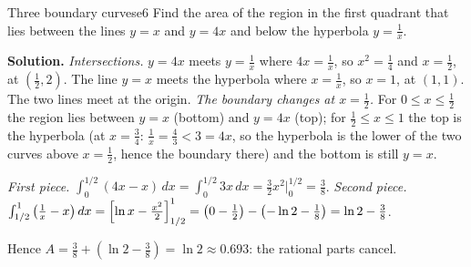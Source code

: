 \documentclass[11pt]{article}
\begin{document}
\begin{exmp}{Three boundary curves}{e6}
Find the area of the region in the first quadrant that lies between the lines $y=x$ and $y=4x$ and below the hyperbola $y=\frac1x$.

\textbf{Solution.} \emph{Intersections.} $y=4x$ meets $y=\frac1x$ where $4x=\frac1x$, so $x^2=\frac14$ and $x=\frac12$, at $(\frac12,2)$. The line $y=x$ meets the hyperbola where $x=\frac1x$, so $x=1$, at $(1,1)$. The two lines meet at the origin.
\emph{The boundary changes at $x=\frac12$.} For $0\le x\le\frac12$ the region lies between $y=x$ (bottom) and $y=4x$ (top); for $\frac12\le x\le1$ the top is the hyperbola (at $x=\frac34$: $\frac1x=\frac43<3=4x$, so the hyperbola is the lower of the two curves above $x=\frac12$, hence the boundary there) and the bottom is still $y=x$.

\emph{First piece.} $\int_0^{1/2}(4x-x)\,dx=\int_0^{1/2}3x\,dx=\frac32x^2\Big|_0^{1/2}=\frac38$.
\emph{Second piece.} $\int_{1/2}^1\left(\frac1x-x\right)dx=\Bigl[\ln x-\frac{x^2}2\Bigr]_{1/2}^1=\left(0-\frac12\right)-\left(-\ln2-\frac18\right)=\ln2-\frac38$.

Hence $A=\frac38+\left(\ln2-\frac38\right)=\ln2\approx0.693$: the rational parts cancel.


\end{exmp}
\end{document}
